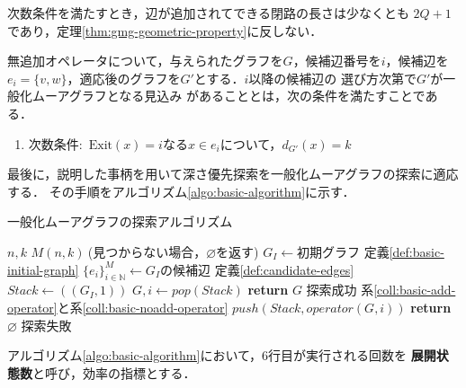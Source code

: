 次数条件を満たすとき，辺が追加されてできる閉路の長さは少なくとも
$2Q+1$であり，定理\ref{thm:gmg-geometric-property}に反しない．

\begin{corollary-without-proof}\rm
  \label{coll:basic-noadd-operator}
  無追加オペレータについて，与えられたグラフを$G$，候補辺番号を$i$，候補辺を
  $e_i=\{v,w\}$，適応後のグラフを$G'$とする．$i$以降の候補辺の
  選び方次第で$G'$が一般化ムーアグラフとなる見込み
  があることとは，次の条件を満たすことである．
  \begin{enumerate}
  \item 次数条件:\ $\text{Exit}(x)=i$なる$x\in e_i$について，$d_{G'}(x)=k$
  \end{enumerate}
\end{corollary-without-proof}

最後に，説明した事柄を用いて深さ優先探索を一般化ムーアグラフの探索に適応する．
その手順をアルゴリズム\ref{algo:basic-algorithm}に示す．
\begin{algorithm}[H]
  \caption{一般化ムーアグラフの探索アルゴリズム}
  \label{algo:basic-algorithm}
  \begin{algorithmic}[1]
    \Require $n,k$
    \Ensure $M(n,k)\:$(見つからない場合，$\varnothing$を返す)
    \State $G_I\gets\text{初期グラフ}$
    \Comment 定義\ref{def:basic-initial-graph}
    \State $\{e_i\}_{i\in\mathbb{N}}^M\gets G_I\text{の候補辺}$
    \Comment 定義\ref{def:candidate-edges}
    \State $Stack\gets((G_I,1))$
    \State $G,i\gets pop(Stack)$
    \State \textbf{return} $G$
    \Comment 探索成功
    \EndIf
    \Comment 系\ref{coll:basic-add-operator}と系\ref{coll:basic-noadd-operator}
    \State $push(Stack,operator(G,i))$
    \EndIf
    \EndFor
    \EndWhile
    \State \textbf{return} $\varnothing$
    \Comment 探索失敗
    \EndProcedure
  \end{algorithmic}
\end{algorithm}
アルゴリズム\ref{algo:basic-algorithm}において，6行目が実行される回数を
\textbf{展開状態数}と呼び，効率の指標とする．

